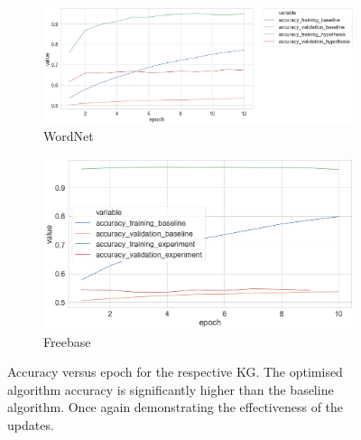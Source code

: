 \begin{figure}[H]
	\begin{subfigure}[b]{.5\linewidth}
   		\centering
    		\includegraphics[width=1.0\linewidth, height=0.6\linewidth]{Wordnet_Accuracy_Results_Early_Stopping}
		\captionsetup{justification=centering}
		\caption{WordNet}
	\end{subfigure}
	\begin{subfigure}[b]{.5\linewidth}
   		\centering
		\includegraphics[width=1.0\linewidth, height=0.6\linewidth]{Freebase_Accuracy_Results}
		\captionsetup{justification=centering}
		\caption{Freebase}
	\end{subfigure}
	\captionsetup{justification=centering}
	\caption{Accuracy versus epoch for the respective KG. The optimised algorithm accuracy is significantly higher than the baseline algorithm. Once again demonstrating the effectiveness of the updates.}
\end{figure}

